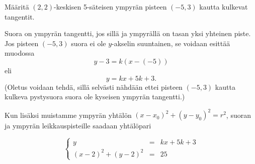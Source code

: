 \begin{esimerkki}

Määritä $(2, 2)$-keskisen 5-säteisen ympyrän pisteen $(-5, 3)$ kautta kulkevat tangentit.

\begin{esimratk}
Suora on ympyrän tangentti, jos sillä ja ympyrällä on tasan yksi yhteinen piste. Jos pisteen $(-5, 3)$ suora ei ole $y$-akselin suuntainen, se voidaan esittää muodossa
\[
y-3 = k(x-(-5))
\]
eli
\[    
y = kx+5k+3.
\]
(Oletus voidaan tehdä, sillä selvästi nähdään ettei pisteen $(-5, 3)$ kautta kulkeva pystysuora suora ole kyseisen ympyrän tangentti.)

Kun lisäksi muistamme ympyrän yhtälön $(x-x_0)^2+(y-y_0)^2 = r^2$, suoran ja ympyrän leikkauspisteille saadaan yhtälöpari

\[
\left\{    
    \begin{array}{rcl}
        y &=& kx+5k+3 \\
        (x-2)^2+(y-2)^2 &=& 25 
\end{array}
    \right.
\]
    

\end{esimratk}
\end{esimerkki}
